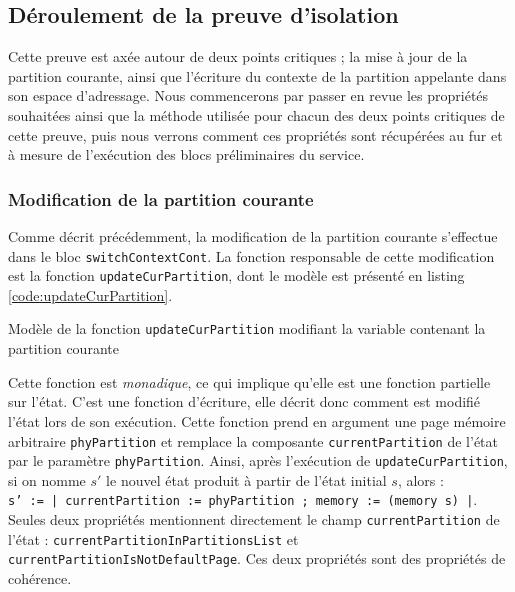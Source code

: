 		\subsection{Déroulement de la preuve d'isolation}

		Cette preuve est axée autour de deux points critiques ; la mise à jour de la partition courante, ainsi que l'écriture du contexte de la partition appelante dans son espace d'adressage. Nous commencerons par passer en revue les propriétés souhaitées ainsi que la méthode utilisée pour chacun des deux points critiques de cette preuve, puis nous verrons comment ces propriétés sont récupérées au fur et à mesure de l'exécution des blocs préliminaires du service.

			\subsubsection{Modification de la partition courante}

			Comme décrit précédemment, la modification de la partition courante s'effectue dans le bloc \texttt{switchContextCont}. La fonction responsable de cette modification est la fonction \texttt{updateCurPartition}, dont le modèle est présenté en listing \ref{code:updateCurPartition}.

			\begin{listing}[!ht]
				\caption{Modèle de la fonction \texttt{updateCurPartition} modifiant la variable contenant la partition courante}
				\label{code:updateCurPartition}
			\end{listing}

			Cette fonction est \emph{monadique}, ce qui implique qu'elle est une fonction partielle sur l'état. C'est une fonction d'écriture, elle décrit donc comment est modifié l'état lors de son exécution. Cette fonction prend en argument une page mémoire arbitraire \texttt{phyPartition} et remplace la composante \texttt{currentPartition} de l'état par le paramètre \texttt{phyPartition}. Ainsi, après l'exécution de \texttt{updateCurPartition}, si on nomme $s'$ le nouvel état produit à partir de l'état initial $s$, alors : \\

			\texttt{s' := {| currentPartition := phyPartition ; memory := (memory s) |}}.\\

			Seules deux propriétés mentionnent directement le champ \texttt{currentPartition} de l'état : \texttt{currentPartitionInPartitionsList} et \texttt{currentPartitionIsNotDefaultPage}. Ces deux propriétés sont des propriétés de cohérence.

